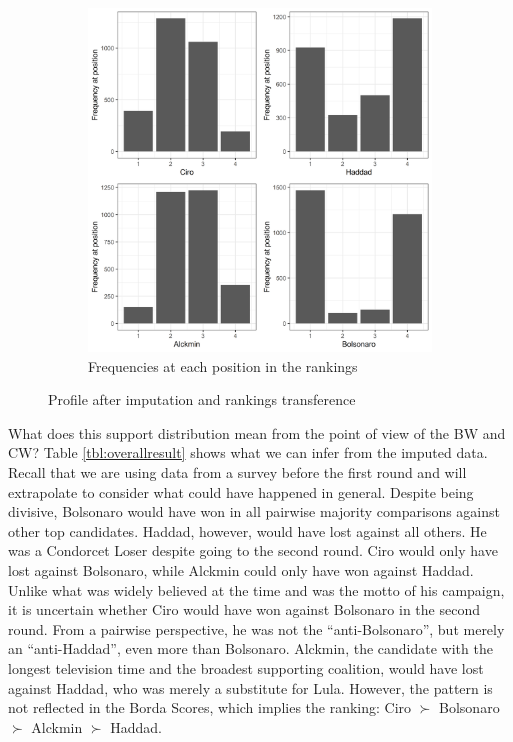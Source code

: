 \documentclass[hidelinks,11pt]{article} \usepackage[utf8]{inputenc}
\begin{document}
\begin{figure}[!h]
\begin{subfigure}[b]{0.8\textwidth}
\includegraphics[width=\textwidth]{./images/corrected1_indexes_plot.png}
 \caption{Frequencies at each position in the rankings}
 \label{fig:counts}
\end{subfigure}
\caption{Profile after imputation and rankings transference}
\label{fig:profile_trans}
\end{figure}

What does this support distribution mean from the point of view of the BW and
CW? Table \ref{tbl:overallresult} shows what we can infer from the imputed data. Recall that we are using data from a survey before the first round and will extrapolate to consider what could have happened in general. Despite being divisive, Bolsonaro would have won in all pairwise majority comparisons against other top candidates. Haddad, however, would have lost against all others. He was a Condorcet Loser despite going to the second round. Ciro would only have lost against Bolsonaro, while Alckmin could only have won against Haddad. Unlike what was widely believed at the time and was the motto of his campaign, it is uncertain whether Ciro would have won against Bolsonaro in the second round. From a pairwise perspective, he was not the ``anti-Bolsonaro'', but merely an ``anti-Haddad'', even more than Bolsonaro. Alckmin, the candidate with the longest television time and the broadest supporting coalition, would have lost against Haddad, who was merely a substitute for Lula. However, the pattern is not reflected in the Borda Scores, which implies the ranking: Ciro \(\succ\) Bolsonaro \(\succ\) Alckmin \(\succ\) Haddad.
\end{document}
